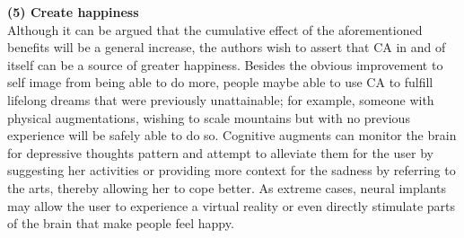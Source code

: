 {\bf (5) Create happiness} \\
Although it can be argued that the cumulative effect of the aforementioned benefits will be a general increase, the authors wish to assert that CA in and of itself can be a source of greater happiness. Besides the obvious improvement to self image from being able to do more, people maybe able to use CA to fulfill lifelong dreams that were previously unattainable; for example, someone with physical augmentations, wishing to scale mountains but with no previous experience will be safely able to do so. Cognitive augments can monitor the brain for depressive thoughts pattern and attempt to alleviate them for the user by suggesting her activities or providing more context for the sadness by referring to the arts, thereby allowing her to cope better. As extreme cases, neural implants may allow the user to experience a virtual reality or even directly stimulate parts of the brain that make people feel happy.



